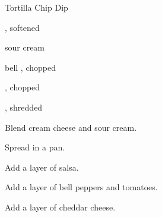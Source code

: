 \begin{recipe}{Tortilla Chip Dip}{}{}

\begin{ingredients}
\item {} , softened
\item \C{\half} sour cream
\item {}
\item bell , chopped
\item {}, chopped
\item {}, shredded
\end{ingredients}

\begin{directions}
\item Blend cream cheese and sour cream.
\item Spread in a pan.
\item Add a layer of salsa.
\item Add a layer of bell peppers and tomatoes.
\item Add a layer of cheddar cheese.
\end{directions}

\end{recipe}
